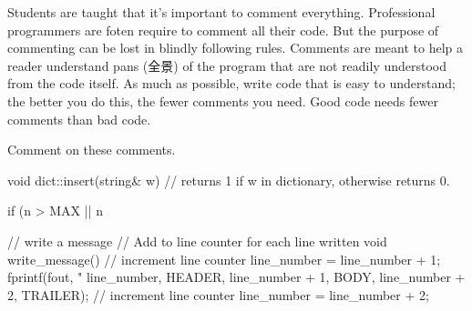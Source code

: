 Students are taught that it's important to comment everything. Professional
programmers are foten require to comment all their code. But the purpose of
commenting can be lost in blindly following rules. Comments are meant to
help a reader understand pans (全景) of the program that are not readily
understood from the code itself. As much as possible, write code that is
easy to understand; the better you do this, the fewer comments you need.
Good code needs fewer comments than bad code.

\begin{exercise}
    Comment on these comments.
    \begin{badcode}
        void dict::insert(string& w)
        // returns 1 if w in dictionary, otherwise returns 0.
    \end{badcode}
    \begin{badcode}
        if (n > MAX || n %
    \end{badcode}
    \begin{badcode}
        // write a message
        // Add to line counter for each line written
        void write_message()
        {
            // increment line counter
            line_number = line_number + 1;
            fprintf(fout, "%
                line_number, HEADER,
                line_number + 1, BODY,
                line_number + 2, TRAILER);
            // increment line counter
            line_number = line_number + 2;
        }
    \end{badcode}
\end{exercise}
